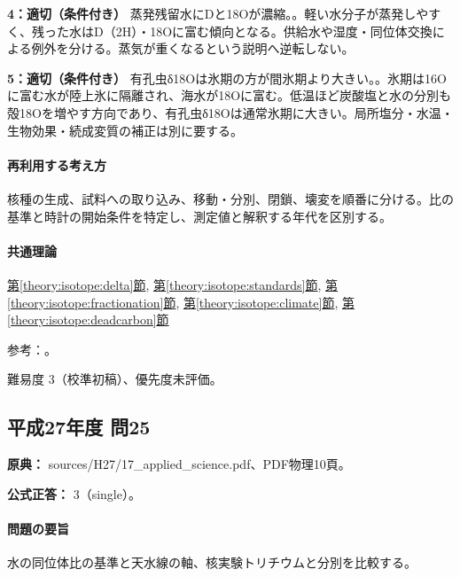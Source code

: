 \noindent\textbf{4：適切（条件付き）} 蒸発残留水にDと18Oが濃縮。。軽い水分子が蒸発しやすく、残った水はD（2H）・18Oに富む傾向となる。供給水や湿度・同位体交換による例外を分ける。蒸気が重くなるという説明へ逆転しない。\par

\noindent\textbf{5：適切（条件付き）} 有孔虫δ18Oは氷期の方が間氷期より大きい。。氷期は16Oに富む水が陸上氷に隔離され、海水が18Oに富む。低温ほど炭酸塩と水の分別も殻18Oを増やす方向であり、有孔虫δ18Oは通常氷期に大きい。局所塩分・水温・生物効果・続成変質の補正は別に要する。\par

\paragraph{再利用する考え方} 核種の生成、試料への取り込み、移動・分別、閉鎖、壊変を順番に分ける。比の基準と時計の開始条件を特定し、測定値と解釈する年代を区別する。

\paragraph{共通理論} \hyperref[theory:isotope:delta]{第\ref*{theory:isotope:delta}節}, \hyperref[theory:isotope:standards]{第\ref*{theory:isotope:standards}節}, \hyperref[theory:isotope:fractionation]{第\ref*{theory:isotope:fractionation}節}, \hyperref[theory:isotope:climate]{第\ref*{theory:isotope:climate}節}, \hyperref[theory:isotope:deadcarbon]{第\ref*{theory:isotope:deadcarbon}節}

\par 参考：\cite{iso_standards1995,iso_oxygen,iso_deadcarbon,iso_hydrothermal}。

\par 難易度 3（校準初稿）、優先度未評価。

\subsection{平成27年度 問25}
\label{q:h27-reg-applied-25}

\noindent\textbf{原典：} sources/H27/17\_applied\_science.pdf、PDF物理10頁。

\textbf{公式正答：} 3（single）。

\paragraph{問題の要旨} 水の同位体比の基準と天水線の軸、核実験トリチウムと分別を比較する。


